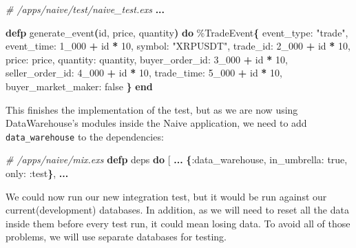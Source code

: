 \documentclass[
  oneside]{book}
\newenvironment{Shaded}{\begin{snugshade}}{\end{snugshade}}
\newcommand{\CommentTok}[1]{\textcolor[rgb]{0.56,0.35,0.01}{\textit{#1}}}
\newcommand{\ConstantTok}[1]{\textcolor[rgb]{0.56,0.35,0.01}{#1}}
\newcommand{\DecValTok}[1]{\textcolor[rgb]{0.00,0.00,0.81}{#1}}
\newcommand{\FunctionTok}[1]{\textcolor[rgb]{0.13,0.29,0.53}{\textbf{#1}}}
\newcommand{\KeywordTok}[1]{\textcolor[rgb]{0.13,0.29,0.53}{\textbf{#1}}}
\newcommand{\NormalTok}[1]{#1}
\newcommand{\OperatorTok}[1]{\textcolor[rgb]{0.81,0.36,0.00}{\textbf{#1}}}
\newcommand{\OtherTok}[1]{\textcolor[rgb]{0.56,0.35,0.01}{#1}}
\newcommand{\StringTok}[1]{\textcolor[rgb]{0.31,0.60,0.02}{#1}}
\newcommand{\VariableTok}[1]{\textcolor[rgb]{0.00,0.00,0.00}{#1}}
\begin{document}
\begin{Shaded}
\begin{Highlighting}[]
  \CommentTok{\# /apps/naive/test/naive\_test.exs}
  \OperatorTok{...}
  
  \KeywordTok{defp}\NormalTok{ generate\_event}\FunctionTok{(}\NormalTok{id, price, quantity}\FunctionTok{)} \KeywordTok{do}
\NormalTok{    \%}\ConstantTok{TradeEvent}\FunctionTok{\{}
      \VariableTok{event\_type:} \StringTok{"trade"}\NormalTok{,}
      \VariableTok{event\_time:} \DecValTok{1\_000} \OperatorTok{+}\NormalTok{ id }\OperatorTok{*} \DecValTok{10}\NormalTok{,}
      \VariableTok{symbol:} \StringTok{"XRPUSDT"}\NormalTok{,}
      \VariableTok{trade\_id:} \DecValTok{2\_000} \OperatorTok{+}\NormalTok{ id }\OperatorTok{*} \DecValTok{10}\NormalTok{,}
      \VariableTok{price:}\NormalTok{ price,}
      \VariableTok{quantity:}\NormalTok{ quantity,}
      \VariableTok{buyer\_order\_id:} \DecValTok{3\_000} \OperatorTok{+}\NormalTok{ id }\OperatorTok{*} \DecValTok{10}\NormalTok{,}
      \VariableTok{seller\_order\_id:} \DecValTok{4\_000} \OperatorTok{+}\NormalTok{ id }\OperatorTok{*} \DecValTok{10}\NormalTok{,}
      \VariableTok{trade\_time:} \DecValTok{5\_000} \OperatorTok{+}\NormalTok{ id }\OperatorTok{*} \DecValTok{10}\NormalTok{,}
      \VariableTok{buyer\_market\_maker:} \ConstantTok{false}
    \FunctionTok{\}}
  \KeywordTok{end}
\end{Highlighting}
\end{Shaded}

This finishes the implementation of the test, but as we are now using DataWarehouse's modules inside the Naive application, we need to add \texttt{data\_warehouse} to the dependencies:

\begin{Shaded}
\begin{Highlighting}[]
  \CommentTok{\# /apps/naive/mix.exs}
  \KeywordTok{defp}\NormalTok{ deps }\KeywordTok{do}
    \OtherTok{[}
      \OperatorTok{...}
      \FunctionTok{\{}\VariableTok{:data\_warehouse}\NormalTok{, }\VariableTok{in\_umbrella:} \ConstantTok{true}\NormalTok{, }\VariableTok{only:} \VariableTok{:test}\FunctionTok{\}}\NormalTok{,}
      \OperatorTok{...}
\end{Highlighting}
\end{Shaded}

We could now run our new integration test, but it would be run against our current(development) databases. In addition, as we will need to reset all the data inside them before every test run, it could mean losing data. To avoid all of those problems, we will use separate databases for testing.
\end{document}
